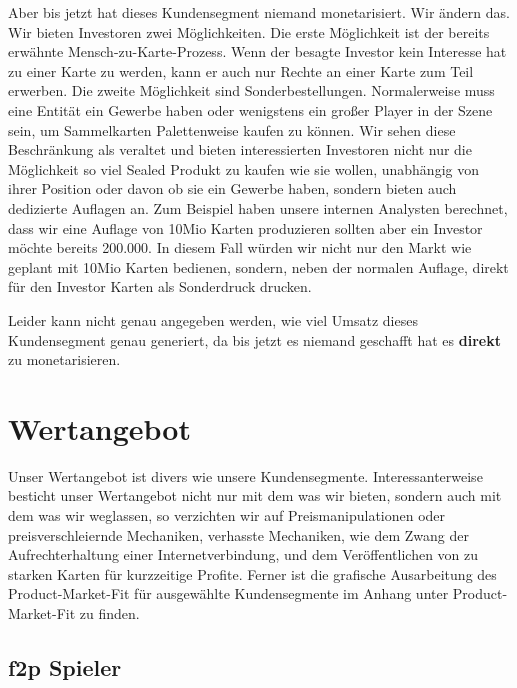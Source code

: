 \documentclass[fontsize=11, a4aper]{scrartcl}
\begin{document}
\noindent Aber bis jetzt hat dieses Kundensegment niemand monetarisiert. Wir ändern das. Wir bieten Investoren zwei Möglichkeiten. Die erste Möglichkeit ist der bereits erwähnte \glqq Mensch-zu-Karte-Prozess\grqq. Wenn der besagte Investor kein Interesse hat zu einer Karte zu werden, kann er auch nur Rechte an einer Karte zum Teil erwerben. Die zweite Möglichkeit sind Sonderbestellungen. Normalerweise muss eine Entität ein Gewerbe haben oder wenigstens ein großer Player in der Szene sein, um Sammelkarten Palettenweise kaufen zu können. Wir sehen diese Beschränkung als veraltet und bieten interessierten Investoren nicht nur die Möglichkeit so viel Sealed Produkt zu kaufen wie sie wollen, unabhängig von ihrer Position oder davon ob sie ein Gewerbe haben, sondern bieten auch dedizierte Auflagen an. Zum Beispiel haben unsere internen Analysten berechnet, dass wir eine Auflage von 10Mio Karten produzieren sollten aber ein Investor möchte bereits 200.000. In diesem Fall würden wir nicht nur den Markt wie geplant mit 10Mio Karten bedienen, sondern, neben der normalen Auflage, direkt für den Investor Karten als Sonderdruck drucken.\hfill\newline

\noindent Leider kann nicht genau angegeben werden, wie viel Umsatz dieses Kundensegment genau generiert, da bis jetzt es niemand geschafft hat es \textbf{direkt} zu monetarisieren.

\section{Wertangebot} \label{sec:Wertangebot}

Unser Wertangebot ist divers wie unsere Kundensegmente. Interessanterweise besticht unser Wertangebot nicht nur mit dem was wir bieten, sondern auch mit dem was wir weglassen, so verzichten wir auf Preismanipulationen oder preisverschleiernde Mechaniken, verhasste Mechaniken, wie dem Zwang der Aufrechterhaltung einer Internetverbindung, und dem Veröffentlichen von zu starken Karten für kurzzeitige Profite. Ferner ist die grafische Ausarbeitung des Product-Market-Fit für ausgewählte Kundensegmente im Anhang unter \glqq Product-Market-Fit\grqq{} zu finden.


\subsection{\acl{f2p} Spieler} \label{subsec:Wertangebot:f2p_Spieler}
\end{document}

